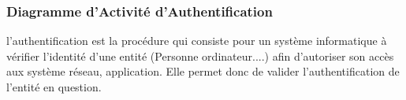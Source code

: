\subsubsection{Diagramme d'Activité d'Authentification}

l'authentification est la procédure qui consiste pour un système informatique à vérifier l'identité d'une entité (Personne ordinateur....) afin d'autoriser son accès aux système réseau, application. Elle permet donc de valider l'authentification de l'entité en question.